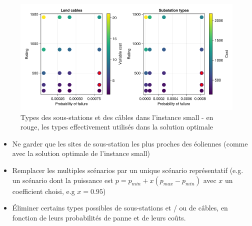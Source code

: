 \documentclass[a4paper,12pt]{article}
\begin{document}
\begin{figure}[h]
    \centering
    \includegraphics[scale=0.4]{small-types.png}
    \caption{Types des sous-stations et des câbles dans l'instance small - en rouge, les types effectivement utilisés dans la solution optimale}
\end{figure}

\begin{itemize}
    \item Ne garder que les sites de sous-station les plus proches des éoliennes (comme avec la solution optimale de l'instance small)
    \item Remplacer les multiples scénarios par un unique scénario représentatif (e.g. un scénario dont la puissance est $p = p_{min} + x(p_{max} - p_{min})$ avec $x$ un coefficient choisi, e.g $x = 0.95$)
    \item Éliminer certains types possibles de sous-stations et / ou de câbles, en fonction de leurs probabilités de panne et de leurs coûts.
\end{itemize}
\end{document}
